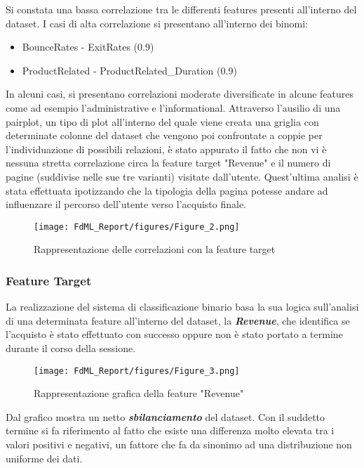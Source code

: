 \documentclass[10pt,a4paper]{article}
\begin{document}
Si constata una bassa correlazione tra le differenti features presenti all'interno del dataset.
I casi di alta correlazione si presentano all'interno dei binomi: 
\begin{itemize}
    \item BounceRates - ExitRates (0.9)
\end{itemize}
\begin{itemize}
    \item ProductRelated - ProductRelated\_Duration (0.9)
\end{itemize}
In alcuni casi, si presentano correlazioni moderate diversificate in alcune features come ad esempio l'administrative e l'informational.\hfill \break
Attraverso l'ausilio di una pairplot, un tipo di plot all'interno del quale viene creata una griglia con determinate colonne del dataset che vengono poi confrontate a coppie per l'individuazione di possibili relazioni, è stato appurato il fatto che non vi è nessuna stretta correlazione circa la feature target "Revenue" e il numero di pagine (suddivise nelle sue tre varianti) visitate dall'utente.\hfill \break
Quest'ultima analisi è stata effettuata ipotizzando che la tipologia della pagina potesse andare ad influenzare il percorso dell'utente verso l'acquisto finale.

\begin{figure}[ht]
    \centering\texttt{[image: FdML\_Report/figures/Figure\_2.png]}
    \caption{Rappresentazione delle correlazioni con la feature target}
    \label{fig:example}
\end{figure}
\clearpage

\subsubsection{Feature Target}
La realizzazione del sistema di classificazione binario basa la sua logica sull'analisi di una determinata feature all'interno del dataset, la \textbf{\emph{Revenue}}, che identifica se l'acquisto è stato effettuato con successo oppure non è stato portato a termine durante il corso della sessione.

\begin{figure}[ht]
    \centering\texttt{[image: FdML\_Report/figures/Figure\_3.png]}
    \caption{Rappresentazione grafica della feature "Revenue"}
    \label{fig:example}
\end{figure}

Dal grafico mostra un netto \textbf{\emph{sbilanciamento}} del dataset. Con il suddetto termine si fa riferimento al fatto che esiste una differenza molto elevata tra i valori positivi e negativi, un fattore che fa da sinonimo ad una distribuzione non uniforme dei dati.
\end{document}

